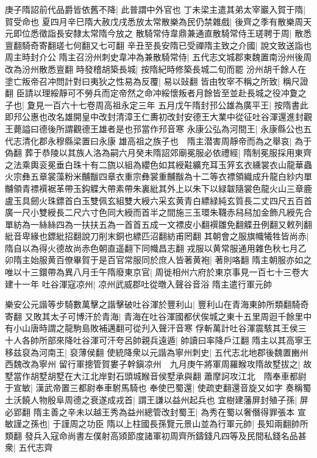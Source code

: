 庚子隋詔前代品爵皆依舊不降|{
	此普謂中外官也}
丁未梁主遣其弟太宰巖入賀于隋|{
	賀受命也}
夏四月辛巳隋大赦戊戌悉放太常散樂為民仍禁雜戲|{
	後齊之季有散樂周天元即位悉徵詣長安隸太常隋今放之}
散騎常侍韋鼎兼通直散騎常侍王瑳聘于周|{
	散悉亶翻騎奇寄翻瑳七何翻又七可翻}
辛丑至長安隋已受禪隋主致之介國|{
	說文致送詣也周主時封介公}
隋主召汾州刺史韋冲為兼散騎常侍|{
	五代志文城郡東魏置南汾州後周改為汾州散悉亶翻}
時發稽胡築長城|{
	按隋紀時修築長城二旬而罷}
汾州胡千餘人在塗亡叛帝召冲問計對曰夷狄之性易為反覆|{
	易以䜴翻}
皆由牧宰不稱之所致|{
	稱尺證翻}
臣請以理綏靜可不勞兵而定帝然之命冲綏懷叛者月餘皆至並赴長城之役冲夐之子也|{
	夐見一百六十七卷周高祖永定三年}
五月戊午隋封邘公雄為廣平王|{
	按隋書此即䢴公惠也改名雄開皇中改封清漳王仁夀初改封安德王大業中從征吐谷渾還進封觀王薨謚曰德後所謂觀德王雄者是也邘當作䢴音寒}
永康公弘為河間王|{
	永康縣公也五代志清化郡永穆縣梁置曰永康}
雄高祖之族子也　隋主潜害周靜帝而為之舉哀|{
	為于偽翻}
葬于恭陵以其族人洛為嗣六月癸未隋詔郊廟冕服必依禮經|{
	隋制冕服採用東齊之法乘輿衮冕垂白珠十有二旒以組為纓色如其綬黈纊充耳玉笄玄衣纁裳衣山龍華蟲火宗彝五章裳藻粉米黼黻四章衣重宗彝裳重黼黻為十二等衣褾領織成升龍白紗内單黼領青褾襈裾革帶玉鈎䚢大帶素帶朱裏紕其外上以朱下以緑韍隨裳色龍火山三章鹿盧玉具劒火珠鏢首白玉雙佩玄組雙大綬六采玄黄青白縹緑純玄質長二丈四尺五百首廣一尺小雙綬長二尺六寸色同大綬而首半之間施三玉環朱韈赤舄舄加金飾凡綬先合單紡為一絲絲四為一扶扶五為一首首五成一文褾皮小翻襈雛免翻䚢丑例翻又敕列翻紕音卑緣也鏢紕招翻說刀削末銅也縹匹沼翻紡甫罔翻}
其朝會之服旗幟犧牲皆尚赤|{
	隋自以為得火德故尚赤色朝直遥翻下同幟昌志翻}
戎服以黄常服通用雜色秋七月乙卯隋主始服黄百僚畢賀于是百官常服同於庶人皆著黄袍|{
	著則咯翻}
隋主朝服亦如之唯以十三鐶帶為異八月壬午隋廢東京官|{
	周徙相州六府於東京事見一百七十三卷大建十一年}
吐谷渾寇凉州|{
	凉州武威郡吐從暾入聲谷音浴}
隋主遣行軍元帥

樂安公元諧等步騎數萬擊之諧擊破吐谷渾於豐利山|{
	豐利山在青海東帥所類翻騎奇寄翻}
又敗其太子可博汗於青海|{
	青海在吐谷渾國都伏俟城之東十五里周迴千餘里中有小山唐時謂之龍駒島敗補邁翻可從刋入聲汗音寒}
俘斬萬計吐谷渾震駭其王侯三十人各帥所部來降吐谷渾可汗夸呂帥親兵遠遁|{
	帥讀曰率降戶江翻}
隋主以其高寧王移兹裒為河南王|{
	裒薄侯翻}
使統降衆以元諧為寧州刺史|{
	五代志北地郡後魏置豳州西魏改為寧州}
留行軍摠管賀婁子幹鎭凉州　九月庚午將軍周羅睺攻隋故墅拔之|{
	故墅當作胡墅胡墅在大江北岸對石頭城睺音侯墅承與翻}
蕭摩訶攻江北　隋奉車都尉于宣敏|{
	漢武帝置三都尉奉車駙馬騎也}
奉使巴蜀還|{
	使疏吏翻還音旋又如字}
奏稱蜀土沃饒人物殷阜周德之衰遂成戎首|{
	謂王謙以益州起兵也}
宜樹建藩屏封殖子孫|{
	屏必郢翻}
隋主善之辛未以越王秀為益州總管改封蜀王|{
	為秀在蜀以奢僭得罪張本}
宣敏謹之孫也|{
	于謹周之功臣}
隋以上柱國長孫覽元景山並為行軍元帥|{
	長知兩翻帥所類翻}
發兵入寇命尚書左僕射高熲節度諸軍初周齊所鑄錢凡四等及民間私錢名品甚衆|{
	五代志齊}


